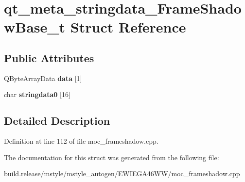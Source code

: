 \hypertarget{structqt__meta__stringdata___frame_shadow_base__t}{}\section{qt\+\_\+meta\+\_\+stringdata\+\_\+\+Frame\+Shadow\+Base\+\_\+t Struct Reference}
\label{structqt__meta__stringdata___frame_shadow_base__t}
\subsection*{Public Attributes}
\begin{DoxyCompactItemize}
\item 
\mbox{\label{structqt__meta__stringdata___frame_shadow_base__t_adc0c793756582faeb1ab94b0d08a5666}} 
Q\+Byte\+Array\+Data {\bfseries data} \mbox{[}1\mbox{]}
\item 
\mbox{\label{structqt__meta__stringdata___frame_shadow_base__t_acbabce3ab86759f0696b29a55c27e888}} 
char {\bfseries stringdata0} \mbox{[}16\mbox{]}
\end{DoxyCompactItemize}


\subsection{Detailed Description}


Definition at line 112 of file moc\+\_\+frameshadow.\+cpp.



The documentation for this struct was generated from the following file\+:\begin{DoxyCompactItemize}
\item 
build.\+release/mstyle/mstyle\+\_\+autogen/\+E\+W\+I\+E\+G\+A46\+W\+W/moc\+\_\+frameshadow.\+cpp\end{DoxyCompactItemize}
